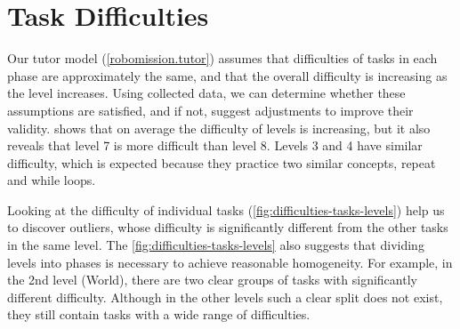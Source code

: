 \section{Task Difficulties}


Our tutor model (\cref{robomission.tutor}) assumes that difficulties of tasks
in each phase are approximately the same,
and that the overall difficulty is increasing as the level increases.   %
Using collected data, we can determine whether these assumptions are satisfied,
and if not, suggest adjustments to improve their validity.
 shows that on average the difficulty of levels
is increasing, but it also reveals that level 7 is more difficult than level 8.
Levels 3 and 4 have similar difficulty, which is expected because they practice
two similar concepts, repeat and while loops.

Looking at the difficulty of individual tasks (\cref{fig:difficulties-tasks-levels})
help us to discover outliers, whose difficulty is significantly
different from the other tasks in the same level.
The \cref{fig:difficulties-tasks-levels} also suggests that dividing levels
into phases is necessary to achieve reasonable homogeneity. For example, in the 2nd
level (World), there are two clear groups of tasks with significantly different
difficulty. Although in the other levels such a clear split does not exist,
they still contain tasks with a wide range of difficulties. %

